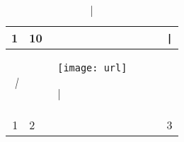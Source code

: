 \begin{longtable}[]{@{}rlc@{}}
\hline
1 & 10 & \texttt{|}\tabularnewline
\hline
\endfirsthead
\textit{|} & 
\begin{figure}
\centering
\texttt{[image: url]}
\caption{|}
\end{figure}
 & \tabularnewline
1 & 2 & 3\tabularnewline
\hline
\end{longtable}
